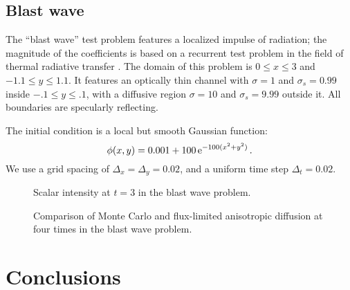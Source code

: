 \subsection{Blast wave}

The ``blast wave'' test problem features a localized impulse of radiation; the
magnitude of the coefficients is based on a recurrent test problem in the field
of thermal radiative transfer \cite{Kno1999a,Kno2001,Rau2005,Ols2007}. The
domain of this problem is $0 \le x \le 3$ and $-1.1 \le y \le 1.1$.
It features an optically thin channel with $\sigma=1$ and $\sigma_s=0.99$ inside
$-.1 \le y \le .1$, with a diffusive region $\sigma=10$ and $\sigma_s=9.99$
outside it. All boundaries are specularly reflecting.

The initial condition is a local but smooth Gaussian function:
\begin{equation*}
  \phi(x,y) = 0.001 + 100 \mathop{}\!\mathrm{e}^{-100 (x^2 + y^2) }\,.
\end{equation*}
We use a grid spacing of $\Delta_x=\Delta_y=0.02$, and a uniform time step
$\Delta_t=0.02$.

\begin{figure}[htb]
  \centering\small

  \caption{Scalar intensity at $t=3$ in the blast wave problem.}
  \label{fig:tdBlastwave}
\end{figure}

\begin{figure}[htb]
  \centering\small
    

  \caption{Comparison of Monte Carlo and flux-limited anisotropic diffusion at
  four times in the blast wave problem.}
  \label{fig:tdBlastwaveAll}
\end{figure}

\section{Conclusions}

